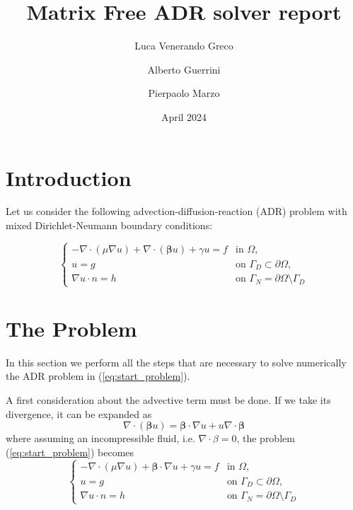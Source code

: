 \documentclass{article}
\title{Matrix Free ADR solver report}
\author{Luca Venerando Greco \and Alberto Guerrini \and Pierpaolo Marzo}
\date{April 2024}
\begin{document}
\maketitle

\section{Introduction}

Let us consider the following advection-diffusion-reaction (ADR) problem with mixed Dirichlet-Neumann boundary conditions:

\begin{equation}\label{eq:start_problem}
\begin{cases}
    -\nabla \cdot (\mu \nabla u) + \nabla \cdot (\boldsymbol{\beta} u) + \gamma u = f & \text{in } \Omega , \\
    u = g & \text{on } \Gamma_D \subset \partial \Omega , \\
    \nabla u \cdot n = h & \text{on } \Gamma_N = \partial \Omega \setminus \Gamma_D
\end{cases}
\end{equation}

\section{The Problem}
In this section we perform all the steps that are necessary to solve numerically the ADR problem in (\ref{eq:start_problem}).

A first consideration about the advective term must be done. If we take its divergence, it can be expanded as
\begin{equation}
    \nabla\cdot(\boldsymbol{\beta}u) = \boldsymbol{\beta}\cdot\nabla u + u\nabla\cdot\boldsymbol{\beta}
\end{equation}
where assuming an incompressible fluid, i.e. $\nabla\cdot\beta = 0$, the problem (\ref{eq:start_problem}) becomes
\begin{equation}\label{eq:adr_problem}
\begin{cases}
    -\nabla \cdot (\mu \nabla u) + \boldsymbol{\beta} \cdot \nabla u + \gamma u = f & \text{in } \Omega , \\
    u = g & \text{on } \Gamma_D \subset \partial \Omega , \\
    \nabla u \cdot n = h & \text{on } \Gamma_N = \partial \Omega \setminus \Gamma_D
\end{cases}
\end{equation}
\end{document}
